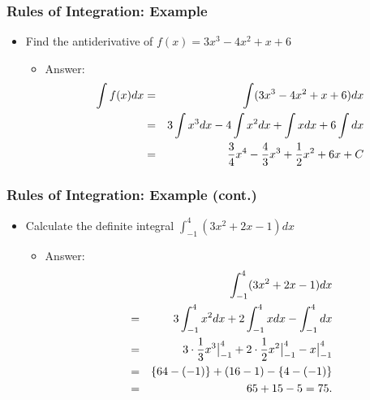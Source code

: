 \documentclass[pdflatex, 12pt]{beamer}
\begin{document}
\begin{frame}
\frametitle{Rules of Integration: Example}
\begin{itemize}
\item Find the antiderivative of $f(x) = 3x^3 - 4x^2 + x + 6$
\vspace{0.4cm}
 \begin{itemize}
 \item Answer:
  \begin{eqnarray}
  \int f(x) dx &=& \int (3x^3 - 4x^2 + x + 6)dx \notag \\
  &=& 3\int x^3 dx - 4\int x^2 dx + \int x dx + 6\int dx \notag \\
  &=& \frac{3}{4}x^4 - \frac{4}{3}x^3 + \frac{1}{2}x^2 + 6x + C \notag
  \end{eqnarray}
 \end{itemize}
\end{itemize}
\end{frame}

\begin{frame}
\frametitle{Rules of Integration: Example (cont.)}
\begin{itemize}
\item Calculate the definite integral $\int^4_{-1} (3x^2 + 2x - 1)dx$
\vspace{0.4cm}
 \begin{itemize}
 \item Answer:
  \begin{eqnarray}
  && \int^4_{-1} (3x^2 + 2x - 1)dx \notag \\
  &=& 3\int^4_{-1} x^2 dx + 2\int^4_{-1} x dx - \int^4_{-1} dx \notag \\
  &=& 3 \cdot \frac{1}{3} x^3\big|^4_{-1} + 2 \cdot \frac{1}{2} x^2\big|^4_{-1} - x\big|^4_{-1} \notag \\
  &=& \left\{64 - (-1)\right\} + (16 - 1) - \left\{4 - (-1)\right\} \notag \\
  &=& 65 + 15 - 5 = 75. \notag
  \end{eqnarray}
 \end{itemize}
\end{itemize}
\end{frame}
\end{document}
